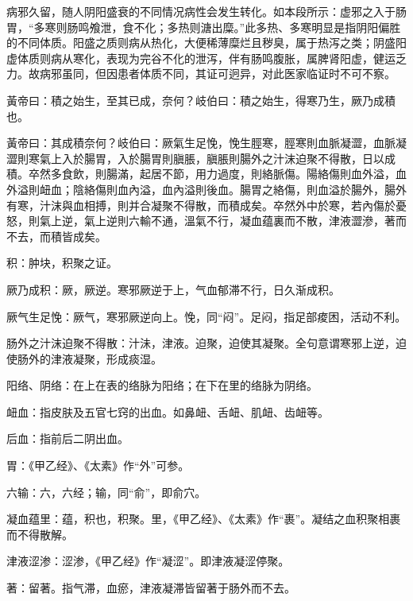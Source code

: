 \documentclass[draft,12pt]{ctexbook}
\begin{document}
病邪久留，随人阴阳盛衰的不同情况病性会发生转化。如本段所示：虚邪之入于肠胃，“多寒则肠鸣飧泄，食不化；多热则溏出糜。”此多热、多寒明显是指阴阳偏胜的不同体质。阳盛之质则病从热化，大便稀薄糜烂且秽臭，属于热泻之类；阴盛阳虚体质则病从寒化，表现为完谷不化的泄泻，伴有肠鸣腹胀，属脾肾阳虚，健运乏力。故病邪虽同，但因患者体质不同，其证可迥异，对此医家临证时不可不察。


\begin{yuanwen}
黃帝曰：積之始生，至其已成，奈何？岐伯曰：積之始生，得寒乃生，厥乃成積也。

黃帝曰：其成積奈何？岐伯曰：厥氣生足悗，悗生脛寒，脛寒則血脈凝澀，血脈凝澀則寒氣上入於腸胃，入於腸胃則䐜脹，䐜脹則腸外之汁沫迫聚不得散，日以成積。卒然多食飲，則腸滿，起居不節，用力過度，則絡脈傷。陽絡傷則血外溢，血外溢則衄血；陰絡傷則血內溢，血內溢則後血。腸胃之絡傷，則血溢於腸外，腸外有寒，汁沫與血相搏，則并合凝聚不得散，而積成矣。卒然外中於寒，若內傷於憂怒，則氣上逆，氣上逆則六輸不通，溫氣不行，凝血蕴裏而不散，津液澀滲，著而不去，而積皆成矣。
\end{yuanwen}


\begin{jiaozhu}
  \item 积：肿块，积聚之证。
  \item 厥乃成积：厥，厥逆。寒邪厥逆于上，气血郁滞不行，日久渐成积。
  \item 厥气生足悗：厥气，寒邪厥逆向上。悗，同“闷”。足闷，指足部痠困，活动不利。
  \item 肠外之汁沫迫聚不得散：汁沬，津液。迫聚，迫使其凝聚。全句意谓寒邪上逆，迫使肠外的津液凝聚，形成痰湿。
  \item 阳络、阴络：在上在表的络脉为阳络；在下在里的络脉为阴络。
  \item 衄血：指皮肤及五官七窍的出血。如鼻衄、舌衄、肌衄、齿衄等。
  \item 后血：指前后二阴出血。
  \item 胃：《甲乙经》、《太素》作“外”可参。
  \item 六输：六，六经；输，同“俞”，即俞穴。
  \item 凝血蕴里：蕴，积也，积聚。里，《甲乙经》、《太素》作“裹”。凝结之血积聚相裹而不得散解。
  \item 津液涩渗：涩渗，《甲乙经》作“凝涩”。即津液凝涩停聚。
  \item 著：留著。指气滞，血瘀，津液凝滞皆留著于肠外而不去。
\end{jiaozhu}
\end{document}
